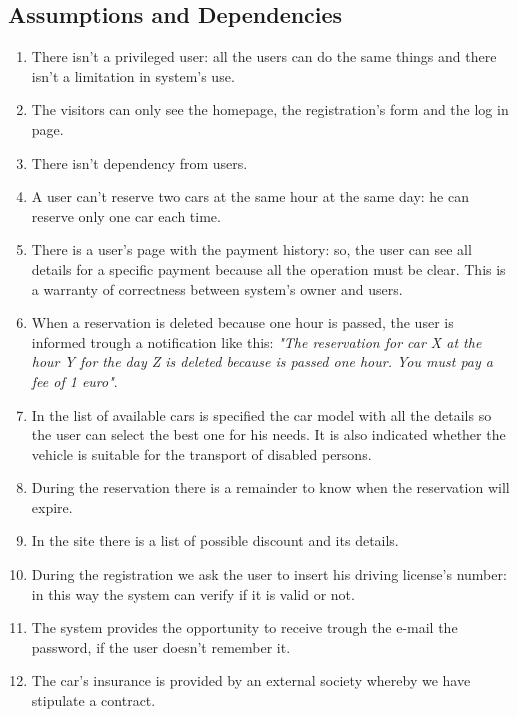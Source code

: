 \subsection{Assumptions and Dependencies} \label{subsec:dependencies}
\begin{enumerate}
\item There isn't a privileged user: all the users can do the same things and there isn't a limitation in system's use.
\item The visitors can only see the homepage, the registration's form and the log in page.
\item There isn't dependency from users.
\item A user can't reserve two cars at the same hour at the same day: he can reserve only one car each time.
\item There is a user's page with the payment history: so, the user can see all details for a specific payment because all the operation must be clear. This is a warranty of correctness between system's owner and users.
\item When a reservation is deleted because one hour is passed, the user is informed trough a notification like this: \emph{"The reservation for car X at the hour Y for the day Z is deleted because is passed one hour. You must pay a fee of 1 euro"}.
\item In the list of available cars is specified the car model with all the details so the user can select the best one for his needs. It is also indicated whether the vehicle is suitable for the transport of disabled persons.
\item During the reservation there is a remainder to know when the reservation will expire.
\item In the site there is a list of possible discount and its details.
\item During the registration we ask the user to insert his driving license's number: in this way the system can verify if it is valid or not.
\item The system provides the opportunity to receive trough the e-mail the password, if the user doesn't remember it.
\item The car's insurance is provided by an external society whereby we have stipulate a contract.
\end{enumerate}

